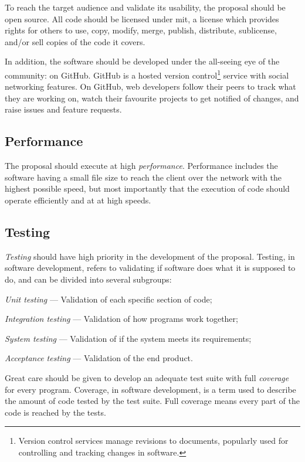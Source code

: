 To reach the target audience and validate its usability, the proposal
  should be open source.
All code should be licensed under \acrshort{mit}, a license which
  provides rights for others to use, copy, modify, merge, publish,
  distribute, sublicense, and\slash or sell copies of the code it covers.

In addition, the software should be developed under the all-seeing eye of
  the community: on GitHub.
GitHub is a hosted version control\footnote{Version
    control services manage revisions to documents, popularly used for
    controlling and tracking changes in software.} service with social
  networking features.
On GitHub, web developers follow their peers to track what they are
  working on, watch their favourite projects to get notified of changes,
  and raise issues and feature requests.

\subsection{Performance}\label{performance}

The proposal should execute at high \emph{performance}.
Performance includes the software having a small file size to reach the
  client over the network with the highest possible speed, but most
  importantly that the execution of code should operate efficiently and
  at at high speeds.

\subsection{Testing}\label{testing}

\emph{Testing} should have high priority in the development of the proposal.
Testing, in software development, refers to validating if software does what
  it is supposed to do, and can be divided into several subgroups:

\begin{aenumerate}
\item\emph{Unit testing} --- Validation of each specific section of code;
\item\emph{Integration testing} --- Validation of how programs work together;
\item\emph{System testing} --- Validation of if the system meets its
  requirements;
\item\emph{Acceptance testing} --- Validation of the end product.
\end{aenumerate}

Great care should be given to develop an adequate test suite with full
  \emph{coverage} for every program.
Coverage, in software development, is a term used to describe the amount of
  code tested by the test suite.
Full coverage means every part of the code is reached by the tests.

